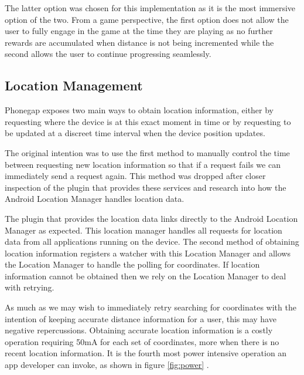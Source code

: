 The latter option was chosen for this implementation as it is the most
immersive option of the two. From a game perspective, the first option
does not allow the user to fully engage in the game at the time they
are playing as no further rewards are accumulated when distance is not
being incremented while the second allows the user to continue
progressing seamlessly. 

\subsection{Location Management}
\label{sec:location_mgmt}
Phonegap exposes two main ways to obtain location information, either
by requesting where the device is at this exact moment in
time\cite{phonegap_currentpos} or by requesting to be updated at a
discreet time interval when the device position
updates\cite{phonegap_watchpos}. 

The original intention was to use the first method to manually control
the time between requesting new location information so that if a
request fails we can immediately send a request again. This method was
dropped after closer inspection of the plugin that provides these
services and research into how the Android Location Manager handles
location data.

The plugin that provides the location data links directly to the
Android Location Manager as expected. This location manager handles
all requests for location data from all applications running on the
device. The second method of obtaining location information registers
a watcher with this Location Manager and allows the Location Manager
to handle the polling for coordinates. If location information cannot
be obtained then we rely on the Location Manager to deal with
retrying. 

As much as we may wish to immediately retry searching for coordinates
with the intention of keeping accurate distance information for a
user, this may have negative repercussions. Obtaining accurate
location information is a costly operation requiring 50mA for each set
of coordinates, more when there is no recent location
information\cite{android_power}. It is the fourth most power intensive
operation an app developer can invoke, as shown in figure
\ref{fig:power} \cite{android_efficiencySlides}.

